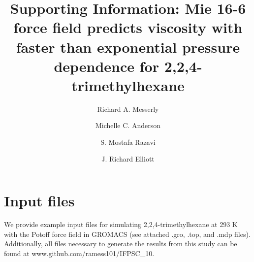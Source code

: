 \documentclass[preprint,review,11pt]{elsarticle}
\begin{document}
	
	\begin{frontmatter}
		
		
		
		\title{Supporting Information: Mie 16-6 force field predicts viscosity with faster than exponential pressure dependence for 2,2,4-trimethylhexane}
		
		
		\author{Richard A. Messerly}
		\address{Thermodynamics Research Center, National Institute of Standards and Technology, Boulder, Colorado, 80305}
		
		\author{Michelle C. Anderson}
		\address{Thermodynamics Research Center, National Institute of Standards and Technology, Boulder, Colorado, 80305}
		
		\author{S. Mostafa Razavi}
		\address{Department of Chemical and Biomolecular Engineering, The University of Akron, Akron, Ohio, 44325-3906}
		
		\author{J. Richard Elliott}
		\address{Department of Chemical and Biomolecular Engineering, The University of Akron, Akron, Ohio, 44325-3906}
				
	\end{frontmatter}	
		
	\section{Input files} \label{SI:Gromacs input files}
	
	We provide example input files for simulating 2,2,4-trimethylhexane at 293 K with the Potoff force field in GROMACS (see attached .gro, .top, and .mdp files). Additionally, all files necessary to generate the results from this study can be found at \newline www.github.com/ramess101/IFPSC\_10.
	
\end{document}
